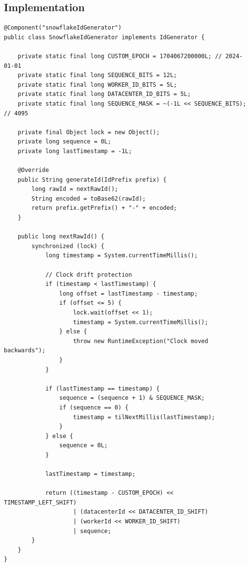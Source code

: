 \documentclass[12pt,a4paper]{report}
\begin{document}
\subsection{Implementation}
\begin{lstlisting}[style=JavaStyle, caption={SnowflakeIdGenerator.java -- Core ID Generation Logic}]
@Component("snowflakeIdGenerator")
public class SnowflakeIdGenerator implements IdGenerator {

    private static final long CUSTOM_EPOCH = 1704067200000L; // 2024-01-01
    private static final long SEQUENCE_BITS = 12L;
    private static final long WORKER_ID_BITS = 5L;
    private static final long DATACENTER_ID_BITS = 5L;
    private static final long SEQUENCE_MASK = ~(-1L << SEQUENCE_BITS); // 4095

    private final Object lock = new Object();
    private long sequence = 0L;
    private long lastTimestamp = -1L;

    @Override
    public String generateId(IdPrefix prefix) {
        long rawId = nextRawId();
        String encoded = toBase62(rawId);
        return prefix.getPrefix() + "-" + encoded;
    }

    public long nextRawId() {
        synchronized (lock) {
            long timestamp = System.currentTimeMillis();

            // Clock drift protection
            if (timestamp < lastTimestamp) {
                long offset = lastTimestamp - timestamp;
                if (offset <= 5) {
                    lock.wait(offset << 1);
                    timestamp = System.currentTimeMillis();
                } else {
                    throw new RuntimeException("Clock moved backwards");
                }
            }

            if (lastTimestamp == timestamp) {
                sequence = (sequence + 1) & SEQUENCE_MASK;
                if (sequence == 0) {
                    timestamp = tilNextMillis(lastTimestamp);
                }
            } else {
                sequence = 0L;
            }

            lastTimestamp = timestamp;

            return ((timestamp - CUSTOM_EPOCH) << TIMESTAMP_LEFT_SHIFT)
                    | (datacenterId << DATACENTER_ID_SHIFT)
                    | (workerId << WORKER_ID_SHIFT)
                    | sequence;
        }
    }
}
\end{lstlisting}
\end{document}
